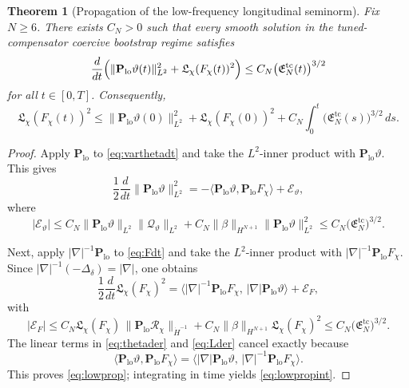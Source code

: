 \documentclass[11pt]{article}
\newtheorem{theorem}{Theorem}
\begin{document}
\begin{theorem}[Propagation of the low-frequency longitudinal seminorm]
\label{thm:lowprop}
Fix \(N\ge 6\). There exists \(C_N>0\) such that every smooth solution in the tuned-compensator coercive bootstrap regime satisfies
\begin{equation}
\frac{d}{dt}
\Bigl(
\|\mathbf P_{\mathrm{lo}}\vartheta(t)\|_{L^2}^2
+\mathfrak L_\chi(F_\chi(t))^2
\Bigr)
\le
C_N\bigl(\mathfrak E_N^{\mathrm{tc}}(t)\bigr)^{3/2}
\label{eq:lowprop}
\end{equation}
for all \(t\in[0,T]\). Consequently,
\begin{equation}
\mathfrak L_\chi(F_\chi(t))^2
\le
\|\mathbf P_{\mathrm{lo}}\vartheta(0)\|_{L^2}^2
+\mathfrak L_\chi(F_\chi(0))^2
+C_N\int_0^t
\bigl(\mathfrak E_N^{\mathrm{tc}}(s)\bigr)^{3/2}\,ds.
\label{eq:lowpropint}
\end{equation}
\end{theorem}

\begin{proof}
Apply \(\mathbf P_{\mathrm{lo}}\) to \eqref{eq:varthetadt} and take the \(L^2\)-inner product with \(\mathbf P_{\mathrm{lo}}\vartheta\). This gives
\begin{equation}
\frac12\frac{d}{dt}\|\mathbf P_{\mathrm{lo}}\vartheta\|_{L^2}^2
=
-\langle \mathbf P_{\mathrm{lo}}\vartheta,\mathbf P_{\mathrm{lo}}F_\chi\rangle
+\mathcal E_\vartheta,
\label{eq:thetader}
\end{equation}
where
\[
|\mathcal E_\vartheta|
\le
C_N\|\mathbf P_{\mathrm{lo}}\vartheta\|_{L^2}\|\mathcal Q_\vartheta\|_{L^2}
+C_N\|\beta\|_{H^{N+1}}\|\mathbf P_{\mathrm{lo}}\vartheta\|_{L^2}^2
\le
C_N\bigl(\mathfrak E_N^{\mathrm{tc}}\bigr)^{3/2}.
\]

Next, apply \(|\nabla|^{-1}\mathbf P_{\mathrm{lo}}\) to \eqref{eq:Fdt} and take the \(L^2\)-inner product with \(|\nabla|^{-1}\mathbf P_{\mathrm{lo}}F_\chi\). Since \(|\nabla|^{-1}(-\Delta_\delta)=|\nabla|\), one obtains
\begin{equation}
\frac12\frac{d}{dt}\mathfrak L_\chi(F_\chi)^2
=
\langle |\nabla|^{-1}\mathbf P_{\mathrm{lo}}F_\chi,\,
|\nabla|\mathbf P_{\mathrm{lo}}\vartheta\rangle
+\mathcal E_F,
\label{eq:Lder}
\end{equation}
with
\[
|\mathcal E_F|
\le
C_N\mathfrak L_\chi(F_\chi)\,
\|\mathbf P_{\mathrm{lo}}\mathcal R_\chi\|_{\dot H^{-1}}
+C_N\|\beta\|_{H^{N+1}}\mathfrak L_\chi(F_\chi)^2
\le
C_N\bigl(\mathfrak E_N^{\mathrm{tc}}\bigr)^{3/2}.
\]
The linear terms in \eqref{eq:thetader} and \eqref{eq:Lder} cancel exactly because
\[
\langle \mathbf P_{\mathrm{lo}}\vartheta,\mathbf P_{\mathrm{lo}}F_\chi\rangle
=
\langle |\nabla|\mathbf P_{\mathrm{lo}}\vartheta,\,
|\nabla|^{-1}\mathbf P_{\mathrm{lo}}F_\chi\rangle.
\]
This proves \eqref{eq:lowprop}; integrating in time yields \eqref{eq:lowpropint}.
\end{proof}
\end{document}
